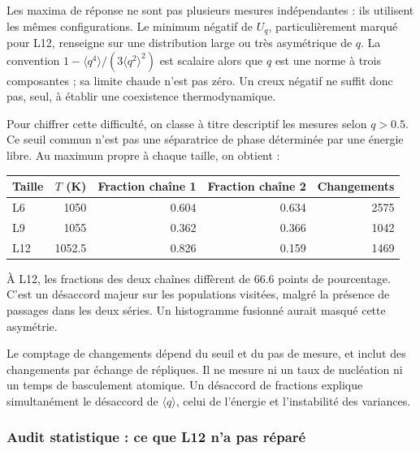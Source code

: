Les maxima de réponse ne sont pas plusieurs mesures indépendantes : ils utilisent les mêmes configurations. Le minimum négatif de $U_q$, particulièrement marqué pour L12, renseigne sur une distribution large ou très asymétrique de $q$. La convention $1-\langle q^4\rangle/(3\langle q^2\rangle^2)$ est scalaire alors que $q$ est une norme à trois composantes ; sa limite chaude n’est pas zéro. Un creux négatif ne suffit donc pas, seul, à établir une coexistence thermodynamique.


Pour chiffrer cette difficulté, on classe à titre descriptif les mesures selon $q>0.5$. Ce seuil commun n’est pas une séparatrice de phase déterminée par une énergie libre. Au maximum propre à chaque taille, on obtient :

\begin{center}\small\begin{tabular}{lrrrr}\toprule

Taille & $T$ (K) & Fraction chaîne 1 & Fraction chaîne 2 & Changements\\\midrule

L6 & 1050 & 0.604 & 0.634 & 2575\\

L9 & 1055 & 0.362 & 0.366 & 1042\\

L12 & 1052.5 & 0.826 & 0.159 & 1469\\

\bottomrule\end{tabular}\end{center}

À L12, les fractions des deux chaînes diffèrent de 66.6 points de pourcentage. C’est un désaccord majeur sur les populations visitées, malgré la présence de passages dans les deux séries. Un histogramme fusionné aurait masqué cette asymétrie.

Le comptage de changements dépend du seuil et du pas de mesure, et inclut des changements par échange de répliques. Il ne mesure ni un taux de nucléation ni un temps de basculement atomique. Un désaccord de fractions explique simultanément le désaccord de $\langle q\rangle$, celui de l’énergie et l’instabilité des variances.

\subsubsection{Audit statistique : ce que L12 n’a pas réparé}

